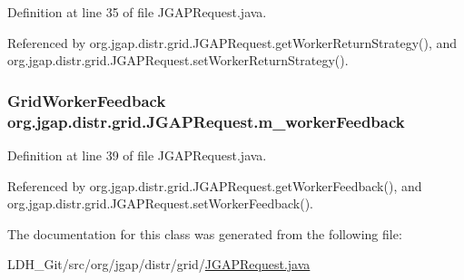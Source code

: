 Definition at line 35 of file J\-G\-A\-P\-Request.\-java.



Referenced by org.\-jgap.\-distr.\-grid.\-J\-G\-A\-P\-Request.\-get\-Worker\-Return\-Strategy(), and org.\-jgap.\-distr.\-grid.\-J\-G\-A\-P\-Request.\-set\-Worker\-Return\-Strategy().

\hypertarget{classorg_1_1jgap_1_1distr_1_1grid_1_1_j_g_a_p_request_ad011d302c184847762d69f35ba3d5c92}{
\subsubsection[{m\-\_\-worker\-Feedback}]{\setlength{\rightskip}{0pt plus 5cm}Grid\-Worker\-Feedback org.\-jgap.\-distr.\-grid.\-J\-G\-A\-P\-Request.\-m\-\_\-worker\-Feedback\hspace{0.3cm}{\ttfamily [private]}}}\label{classorg_1_1jgap_1_1distr_1_1grid_1_1_j_g_a_p_request_ad011d302c184847762d69f35ba3d5c92}


Definition at line 39 of file J\-G\-A\-P\-Request.\-java.



Referenced by org.\-jgap.\-distr.\-grid.\-J\-G\-A\-P\-Request.\-get\-Worker\-Feedback(), and org.\-jgap.\-distr.\-grid.\-J\-G\-A\-P\-Request.\-set\-Worker\-Feedback().



The documentation for this class was generated from the following file\-:\begin{DoxyCompactItemize}
\item 
L\-D\-H\-\_\-\-Git/src/org/jgap/distr/grid/\hyperlink{_j_g_a_p_request_8java}{J\-G\-A\-P\-Request.\-java}\end{DoxyCompactItemize}
